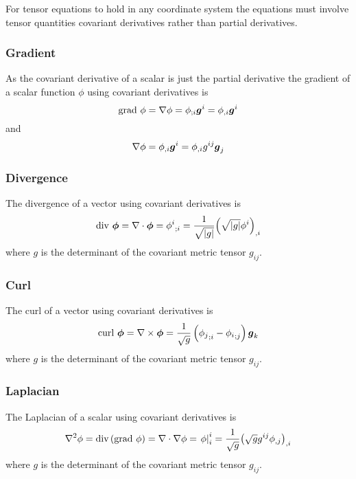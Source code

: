 For tensor equations to hold in any coordinate system the equations must
involve tensor quantities \ie covariant derivatives rather than partial derivatives.

\subsubsection{Gradient}

As the covariant derivative of a scalar is just the partial derivative the
gradient of a scalar function $\phi$ using covariant derivatives is
\begin{equation}
  \text{grad } \phi = \grad{\phi}=\covarderiv{\phi}{i}\vect{g}^{i}=\partialderiv{\phi}{i}\vect{g}^{i}
\end{equation}
and
\begin{equation}
  \grad{\phi}=\partialderiv{\phi}{i}\vect{g}^{i}=\partialderiv{\phi}{i}g^{ij}\vect{g}_{j}
\end{equation}

\subsubsection{Divergence}

The divergence of a vector using covariant derivatives is
\begin{equation}
  \text{div } \vect{\phi} = \diverg{\vect{\phi}}=\covarderiv{\phi^{i}}{i}=\frac{1}{\sqrt{\abs{g}}}\partialderiv{\pbrac{\sqrt{\abs{g}}\phi^{i}}}{i}
\end{equation}
where $g$ is the determinant of the covariant metric tensor $g_{ij}$.

\subsubsection{Curl}

The curl of a vector using covariant derivatives is
\begin{equation}
  \text{curl } \vect{\phi} = \curl{\vect{\phi}}=\frac{1}{\sqrt{g}}\pbrac{\covarderiv{\phi_{j}}{i}-\covarderiv{\phi_{i}}{j}}\vect{g}_{k}
\end{equation}
where $g$ is the determinant of the covariant metric tensor $g_{ij}$.

\subsubsection{Laplacian}

The Laplacian of a scalar using covariant derivatives is
\begin{equation}
  \nabla^{2} {\phi}=\text{div}\left( \text{grad }\phi \right)= \nabla\cdot\nabla\phi = \left. \phi \right|^{i}_{i} =\frac{1}{\sqrt{g}} {\left( \sqrt{g}g^{ij} {\phi}_{,j}  \right)}_{,i} 
\end{equation}
where $g$ is the determinant of the covariant metric tensor $g_{ij}$.


